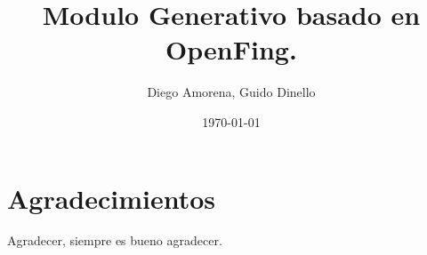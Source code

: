 \documentclass{../../prgrado}
\title{Modulo Generativo basado en \Gls{OpenFing}.}
\author{Diego Amorena, Guido Dinello}
\date{\today}
\begin{document}

\frontmatter %

\maketitle



\chapter*{Agradecimientos}

Agradecer, siempre es bueno agradecer.
\end{document}
